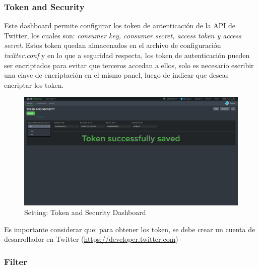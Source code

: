 \documentclass[report]{article}
\begin{document}
\subsubsection{Token and Security}

Este dashboard permite configurar los token de autenticaci\'on de la API de Twitter, los cuales son: \textit{consumer key, consumer secret, access token y access secret}. Estos token quedan almacenados en el archivo de configuraci\'on \textit{twitter.conf} y en lo que a seguridad respecta, los token de autenticaci\'on pueden ser encriptados para evitar que terceros accedan a ellos, solo es necesario escribir una clave de encriptaci\'on en el mismo panel, luego de indicar que deseas encriptar los token.
\newline
\begin{figure}[h!]
	\centering
	\includegraphics[scale=0.2]{img/token.png}
	\caption{\color{text}Setting: Token and Security Dashboard}
\end{figure}

Es importante considerar que: para obtener los token, se debe crear un cuenta de desarrollador en Twitter (\url{https://developer.twitter.com})
\newpage
\subsubsection{Filter}
\end{document}
